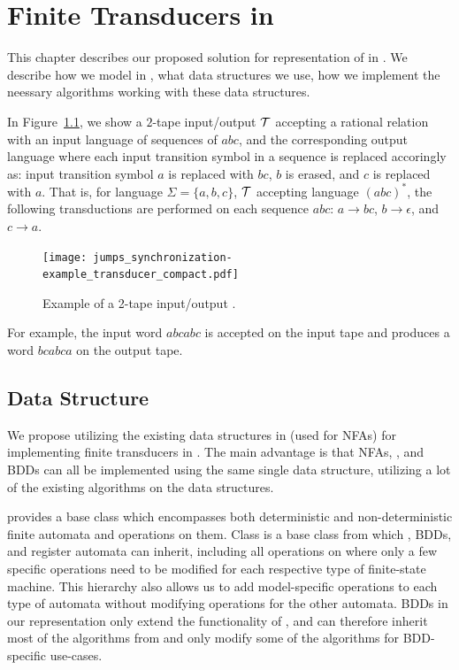 \chapter{Finite Transducers in \mata}

This chapter describes our proposed solution for representation of \nfts in \mata. We describe how we model \nfts in \mata, what data structures we use, how we implement the neessary algorithms working with these data structures.

\begin{example}\label{example:2_tape_nft}
In Figure~\ref{fig:2_tape_nft}, we show a $2$-tape input/output \nft $\mathcal{T}$ accepting a rational relation with an input language of sequences of $abc$, and the corresponding output language where each input transition symbol in a sequence is replaced accoringly as: input transition symbol $a$ is replaced with $bc$, $b$ is erased, and $c$ is replaced with $a$.
That is, for language $\Sigma = \{ a, b, c \}$, $\mathcal{T}$ accepting language $(abc)^*$, the following transductions are performed on each sequence $abc$:
$a \rightarrow bc$,
$b \rightarrow \epsilon$, and
$c \rightarrow a$.

\begin{figure}[!ht]
  \centering
    \texttt{[image: jumps\_synchronization-example\_transducer\_compact.pdf]}
  \caption{
    Example of a 2-tape input/output \nft.
  }\label{fig:2_tape_nft}
\end{figure}

For example, the input word $abcabc$ is accepted on the input tape and produces a word $bcabca$ on the output tape.

\end{example}

\section{Data Structure}
\label{sec:mata_data_structure}
We propose utilizing the existing data structures in \mata (used for NFAs) for implementing finite transducers in \mata.
The main advantage is that NFAs, \nfts, and BDDs can all be implemented using the same single data structure, utilizing a lot of the existing algorithms on the data structures.

\mata provides a base class \nfaClass which encompasses both deterministic and non-deterministic finite automata and operations on them.
Class \nfaClass is a base class from which \nfts, BDDs, and register automata can inherit, including all operations on \nfaClass where only a few specific operations need to be modified for each respective type of finite-state machine.
This hierarchy also allows us to add model-specific operations to each type of automata without modifying operations for the other automata.
BDDs in our representation only extend the functionality of \nfts, and can therefore inherit most of the algorithms from \nfts and only modify some of the algorithms for BDD-specific use-cases.

